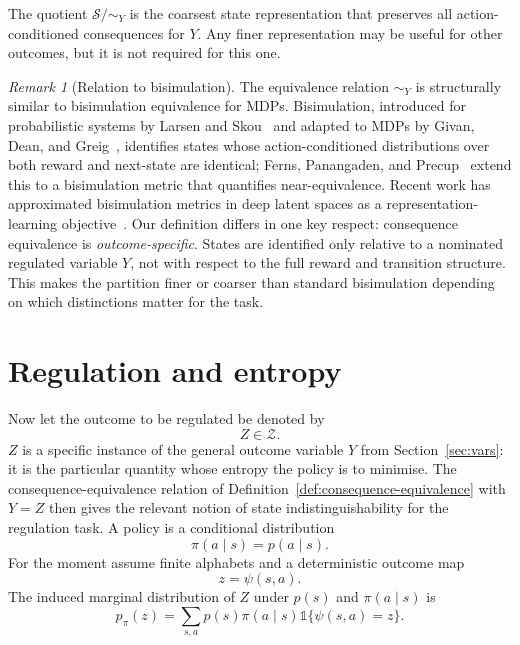 \documentclass[11pt]{article}
\theoremstyle{remark}
\newtheorem{remark}{Remark}
\newcommand{\Scal}{\mathcal S}
\newcommand{\Zcal}{\mathcal Z}
\newcommand{\1}{\mathbb 1}
\begin{document}
The quotient $\Scal/{\sim_Y}$ is the coarsest state representation that preserves all action-conditioned consequences for $Y$. Any finer representation may be useful for other outcomes, but it is not required for this one.

\begin{remark}[Relation to bisimulation]
The equivalence relation $\sim_Y$ is structurally similar to bisimulation equivalence for MDPs. Bisimulation, introduced for probabilistic systems by Larsen and Skou~\citep{Larsen-bisimulation91} and adapted to MDPs by Givan, Dean, and Greig~\citep{Givan-equivalence03}, identifies states whose action-conditioned distributions over both reward and next-state are identical; Ferns, Panangaden, and Precup~\citep{Ferns-metrics04} extend this to a bisimulation metric that quantifies near-equivalence. Recent work has approximated bisimulation metrics in deep latent spaces as a representation-learning objective~\citep{Zhang-learning21,Castro-mico21}. Our definition differs in one key respect: consequence equivalence is \emph{outcome-specific}. States are identified only relative to a nominated regulated variable $Y$, not with respect to the full reward and transition structure. This makes the partition finer or coarser than standard bisimulation depending on which distinctions matter for the task.
\end{remark}

\section{Regulation and entropy}
\label{sec:regulation}

Now let the outcome to be regulated be denoted by
\[
Z\in\Zcal.
\]
$Z$ is a specific instance of the general outcome variable $Y$ from Section~\ref{sec:vars}: it is the particular quantity whose entropy the policy is to minimise. The consequence-equivalence relation of Definition~\ref{def:consequence-equivalence} with $Y=Z$ then gives the relevant notion of state indistinguishability for the regulation task.
A policy is a conditional distribution
\[
\pi(a\mid s)=p(a\mid s).
\]
For the moment assume finite alphabets and a deterministic outcome map
\begin{equation}
    z = \psi(s,a).
    \label{eq:deterministic-outcome-map}
\end{equation}
The induced marginal distribution of $Z$ under $p(s)$ and $\pi(a\mid s)$ is
\begin{equation}
    p_\pi(z)=\sum_{s,a}p(s)\pi(a\mid s)\1\{\psi(s,a)=z\}.
\end{equation}
\end{document}
